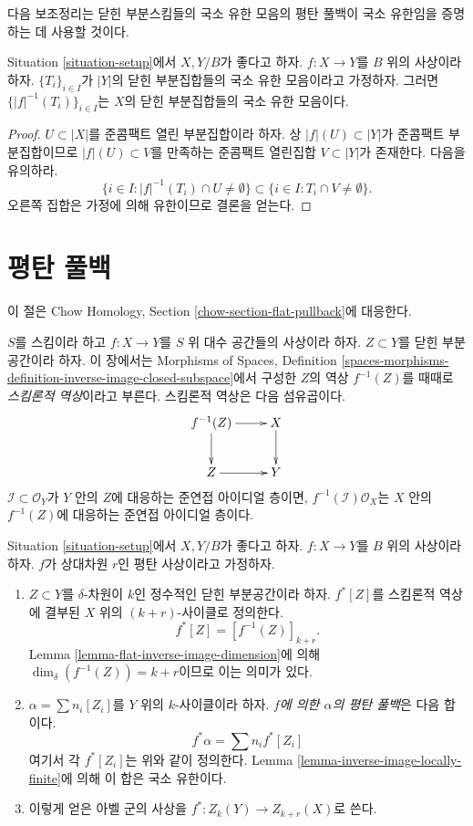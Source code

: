 \noindent
다음 보조정리는 닫힌 부분스킴들의 국소 유한 모음의 평탄 풀백이
국소 유한임을 증명하는 데 사용할 것이다.

\begin{lemma}
\label{lemma-inverse-image-locally-finite}
Situation \ref{situation-setup}에서 $X, Y/B$가 좋다고 하자.
$f : X \to Y$를 $B$ 위의 사상이라 하자.
$\{T_i\}_{i \in I}$가 $|Y|$의 닫힌 부분집합들의 국소 유한 모음이라고
가정하자. 그러면 $\{|f|^{-1}(T_i)\}_{i \in I}$는 $X$의 닫힌
부분집합들의 국소 유한 모음이다.
\end{lemma}

\begin{proof}
$U \subset |X|$를 준콤팩트 열린 부분집합이라 하자.
상 $|f|(U) \subset |Y|$가 준콤팩트 부분집합이므로
$|f|(U) \subset V$를 만족하는 준콤팩트 열린집합
$V \subset |Y|$가 존재한다. 다음을 유의하라.
$$
\{i \in I : |f|^{-1}(T_i) \cap U \not = \emptyset \}
\subset
\{i \in I : T_i \cap V \not = \emptyset \}.
$$
오른쪽 집합은 가정에 의해 유한이므로 결론을 얻는다.
\end{proof}

\section{평탄 풀백}
\label{section-flat-pullback}

\noindent
이 절은 Chow Homology, Section \ref{chow-section-flat-pullback}에 대응한다.

\medskip\noindent
$S$를 스킴이라 하고 $f : X \to Y$를 $S$ 위 대수 공간들의 사상이라 하자.
$Z \subset Y$를 닫힌 부분공간이라 하자. 이 장에서는 Morphisms of Spaces,
Definition
\ref{spaces-morphisms-definition-inverse-image-closed-subspace}에서 구성한
$Z$의 역상 $f^{-1}(Z)$를 때때로 {\it 스킴론적 역상}이라고 부른다.
스킴론적 역상은 다음 섬유곱이다.
$$
\xymatrix{
f^{-1}(Z) \ar[r] \ar[d] & X \ar[d] \\
Z \ar[r] & Y
}
$$
$\mathcal{I} \subset \mathcal{O}_Y$가 $Y$ 안의 $Z$에 대응하는
준연접 아이디얼 층이면, $f^{-1}(\mathcal{I})\mathcal{O}_X$는
$X$ 안의 $f^{-1}(Z)$에 대응하는 준연접 아이디얼 층이다.

\begin{definition}
\label{definition-flat-pullback}
Situation \ref{situation-setup}에서 $X, Y/B$가 좋다고 하자.
$f : X \to Y$를 $B$ 위의 사상이라 하자.
$f$가 상대차원 $r$인 평탄 사상이라고 가정하자.
\begin{enumerate}
\item $Z \subset Y$를 $\delta$-차원이 $k$인 정수적인 닫힌 부분공간이라
하자. $f^*[Z]$를 스킴론적 역상에 결부된 $X$ 위의 $(k+r)$-사이클로
정의한다.
$$
f^*[Z] = [f^{-1}(Z)]_{k+r}.
$$
Lemma \ref{lemma-flat-inverse-image-dimension}에 의해
$\dim_\delta(f^{-1}(Z)) = k + r$이므로 이는 의미가 있다.
\item $\alpha = \sum n_i [Z_i]$를 $Y$ 위의 $k$-사이클이라 하자.
{\it $f$에 의한 $\alpha$의 평탄 풀백}은 다음 합이다.
$$
f^* \alpha = \sum n_i f^*[Z_i]
$$
여기서 각 $f^*[Z_i]$는 위와 같이 정의한다. Lemma
\ref{lemma-inverse-image-locally-finite}에 의해 이 합은 국소 유한이다.
\item 이렇게 얻은 아벨 군의 사상을
$f^* : Z_k(Y) \to Z_{k + r}(X)$로 쓴다.
\end{enumerate}
\end{definition}

